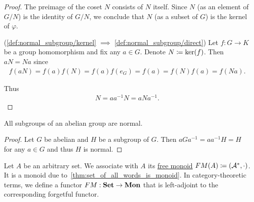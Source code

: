 \begin{proof}
  The preimage of the coset $N$ consists of $N$ itself. Since $N$ (as an element of $G / N$) is the identity of $G / N$, we conclude that $N$ (as a subset of $G$) is the kernel of $\varphi$.

  (\ref{def:normal_subgroup/kernel} $\implies$ \ref{def:normal_subgroup/direct}) Let $f: G \to K$ be a group homomorphism and fix any $a \in G$. Denote $N \coloneqq \operatorname{ker}(f)$. Then $aN = Na$ since
  \begin{align*}
    f(aN)
    =
    f(a) f(N)
    =
    f(a) f(e_G)
    =
    f(a)
    =
    f(N) f(a)
    =
    f(Na).
  \end{align*}

  Thus
  \begin{align*}
    N = aa^{-1}N = aNa^{-1}.
  \end{align*}
\end{proof}

\begin{proposition}\label{thm:abelian_normal_subgroups}
  All subgroups of an abelian group are normal.
\end{proposition}
\begin{proof}
  Let $G$ be abelian and $H$ be a subgroup of $G$. Then $aGa^{-1} = aa^{-1}H = H$ for any $a \in G$ and thus $H$ is normal.
\end{proof}

\begin{definition}\label{def:free_monoid}\cite[306]{Knapp2016BAlg}
  Let $A$ be an arbitrary set. We associate with $A$ its \uline{free monoid} $FM(A) \coloneqq (\mathcal A^{*}, \cdot)$. It is a monoid due to~\cref{thm:set_of_all_words_is_monoid}. In category-theoretic terms, we define a functor $FM: \operatorname{\mathbf{Set}} \to \operatorname{\mathbf{Mon}}$ that is left-adjoint to the corresponding forgetful functor.
\end{definition}

